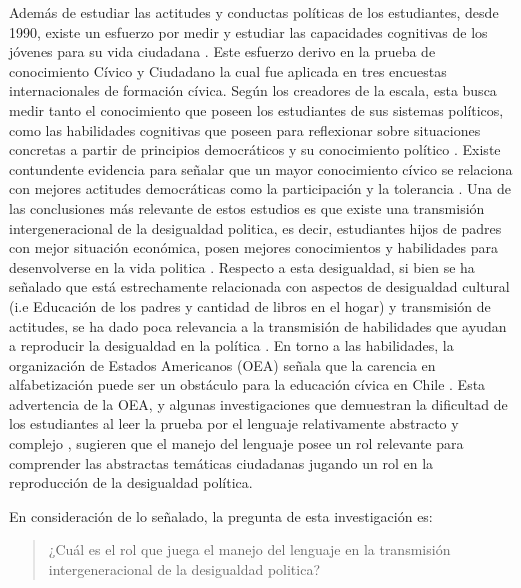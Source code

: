 \documentclass[12pt,twoside]{templates/facsothesis}
\begin{document}
Además de estudiar las actitudes y conductas políticas de los estudiantes, desde 1990, existe un esfuerzo por medir y estudiar las capacidades cognitivas de los jóvenes para su vida ciudadana \citep{torney-purtaEstudioEducacionCivica2015}. Este esfuerzo derivo en la prueba de conocimiento Cívico y Ciudadano la cual fue aplicada en tres encuestas internacionales de formación cívica. Según los creadores de la escala, esta busca medir tanto el conocimiento que poseen los estudiantes de sus sistemas políticos, como las habilidades cognitivas que poseen para reflexionar sobre situaciones concretas a partir de principios democráticos y su conocimiento político \citep{schulzInitialFindsIEA2010}. Existe contundente evidencia para señalar que un mayor conocimiento cívico se relaciona con mejores actitudes democráticas como la participación y la tolerancia \citep{schulzInitialFindsIEA2010, galstonCivicKnowledgeCivic2007, mirandaPoliticalSocializationAttitudes2018}. Una de las conclusiones más relevante de estos estudios es que existe una transmisión intergeneracional de la desigualdad politica, es decir, estudiantes hijos de padres con mejor situación económica, posen mejores conocimientos y habilidades para desenvolverse en la vida politica \citep{schulzInitialFindsIEA2010, mirandaDesigualdadConocimientoCivico2015}. Respecto a esta desigualdad, si bien se ha señalado que está estrechamente relacionada con aspectos de desigualdad cultural (i.e Educación de los padres y cantidad de libros en el hogar) y transmisión de actitudes, se ha dado poca relevancia a la transmisión de habilidades que ayudan a reproducir la desigualdad en la política \citep{bradyPoliticalMobilityPolitical2015}. En torno a las habilidades, la organización de Estados Americanos (OEA) señala que la carencia en alfabetización puede ser un obstáculo para la educación cívica en Chile \citep{torney-purtaEstudioEducacionCivica2015}. Esta advertencia de la OEA, y algunas investigaciones que demuestran la dificultad de los estudiantes al leer la prueba por el lenguaje relativamente abstracto y complejo \citep{zhangUnderstandingCivicCognitive2015, arensmeierSwedishStudentsConceptual2015}, sugieren que el manejo del lenguaje posee un rol relevante para comprender las abstractas temáticas ciudadanas jugando un rol en la reproducción de la desigualdad política.

En consideración de lo señalado, la pregunta de esta investigación es:

\begin{quote}
¿Cuál es el rol que juega el manejo del lenguaje en la transmisión intergeneracional de la desigualdad politica?
\end{quote}
\end{document}
